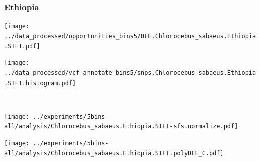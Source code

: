\subsubsection{Ethiopia}

\begin{minipage}{0.49\linewidth}
    \texttt{[image: ../data\_processed/opportunities\_bins5/DFE.Chlorocebus\_sabaeus.Ethiopia.SIFT.pdf]}
\end{minipage}
\begin{minipage}{0.49\linewidth}
    \texttt{[image: ../data\_processed/vcf\_annotate\_bins5/snps.Chlorocebus\_sabaeus.Ethiopia.SIFT.histogram.pdf]}
\end{minipage}
\\
\begin{minipage}{0.49\linewidth}
    \texttt{[image: ../experiments/5bins-all/analysis/Chlorocebus\_sabaeus.Ethiopia.SIFT-sfs.normalize.pdf]}
\end{minipage}
\begin{minipage}{0.4\linewidth}
    \texttt{[image: ../experiments/5bins-all/analysis/Chlorocebus\_sabaeus.Ethiopia.SIFT.polyDFE\_C.pdf]}
\end{minipage}
